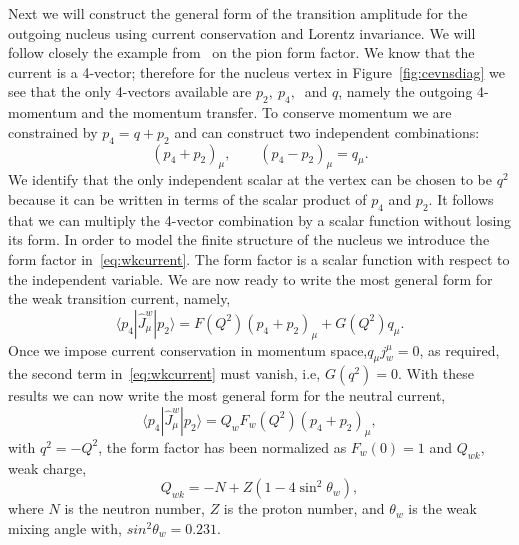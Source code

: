 Next we will construct the general form of the transition amplitude for the outgoing nucleus using current conservation and Lorentz invariance. We will follow closely the example from~\cite{aitchison:2003:gauge} on the pion form factor. We know that the current is a 4-vector; therefore for the nucleus vertex in Figure~\ref{fig:cevnsdiag} we see that the only 4-vectors available are $p_2,\ p_4,\ $ and $q$, namely the outgoing 4-momentum and the momentum transfer. To conserve momentum we are constrained by $p_4=q+p_2$ and can construct two independent combinations:
\begin{equation}
\left( p_4+p_2 \right) _{\mu},\qquad
\left( p_4-p_2 \right) _{\mu}=q_{\mu}.
\end{equation}
We identify that the only independent scalar at the vertex can be chosen to be $q^2$ because it can be written in terms of the scalar product of $p_4$ and $p_2$. It follows that we can multiply the 4-vector combination by a scalar function without losing its form. In order to model the finite structure of the nucleus we introduce the form factor in~\ref{eq:wkcurrent}. The form factor is a scalar function with respect to the independent variable. We are now ready to write the most general form for the weak transition current, namely,
\begin{equation}\label{eq:wkcurrent}
\langle p_4|\hat{J}_{\mu}^{w}|p_2 \rangle = F(Q^2)\left( p_4+p_2 \right) _{\mu}+G(Q^2)q_{\mu}.
\end{equation} 
Once we impose current conservation in momentum space,$q_{\mu}j_{w}^{\mu}=0$, as required, the second term in~\eqref{eq:wkcurrent} must vanish, i.e, $G(q^2)=0$. With these results we can now write the most general form for the neutral current,
\begin{equation}\label{eq:wktrancurrent}
\boxed{
\langle p_4|\hat{J}_{\mu}^{w}|p_2 \rangle = Q_{w}F_{w}(Q^2)\left( p_4+p_2 \right) _{\mu}
},
\end{equation}
with $q^2=-Q^2$, the form factor has been normalized as $F_{w}(0)=1$ and $Q_{wk}$, weak charge,
\begin{equation}\label{eq:wkcharge}
Q_{wk}=-N+Z(1-4\sin ^2\theta _w),
\end{equation}
where $N$ is the neutron number, $Z$ is the proton number, and $\theta _w$ is the weak mixing angle with, $ sin^2\theta _w = 0.231$.
 
